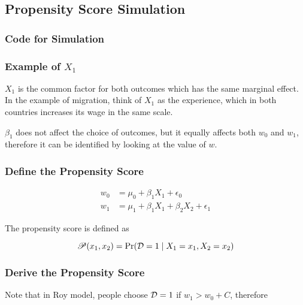 \subsection{Propensity Score Simulation}

\subsubsection{Code for Simulation}



\subsubsection{Example of $X_1$}

$X_1$ is the common factor for both outcomes which has the same marginal effect. In the example of migration, think of $X_1$ as the experience, which in both countries increases its wage in the same scale.

$\beta_1$ does not affect the choice of outcomes, but it equally affects both $w_0$ and $w_1$, therefore it can be identified by looking at the value of $w$. 


\subsubsection{Define the Propensity Score}

\begin{subequations}
    \begin{align}
        w_0 &= \mu_0 + \beta_1 X_1  + \epsilon_0 \label{eq:w0} \\
        w_1 &= \mu_1 + \beta_1 X_1 + \beta_2 X_2 + \epsilon_1 \label{eq:w1}
    \end{align}
\end{subequations}

The propensity score is defined as

\begin{equation}
    \mathscr{P}(x_1, x_2) = \Pr(\mathcal{D} = 1 \mid X_1=x_1, X_2=x_2) \label{eq:roy_pscore}
\end{equation}


\subsubsection{Derive the Propensity Score}
Note that in Roy model, people choose $\mathcal{D} = 1$ if $w_1 > w_0 + C$, therefore

